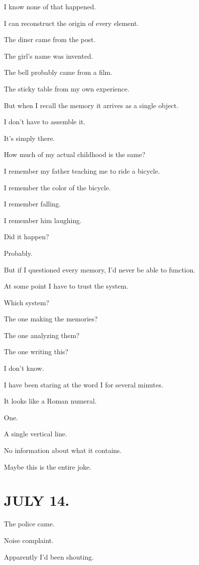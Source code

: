 \documentclass[11pt,oneside]{book}
\begin{document}
I know none of that happened.

I can reconstruct the origin of every element.

The diner came from the post.

The girl's name was invented.

The bell probably came from a film.

The sticky table from my own experience.

But when I recall the memory it arrives as a single object.

I don't have to assemble it.

It's simply there.

How much of my actual childhood is the same?

I remember my father teaching me to ride a bicycle.

I remember the color of the bicycle.

I remember falling.

I remember him laughing.

Did it happen?

Probably.

But if I questioned every memory, I'd never be able to function.

At some point I have to trust the system.

Which system?

The one making the memories?

The one analyzing them?

The one writing this?

I don't know.

I have been staring at the word I for several minutes.

It looks like a Roman numeral.

One.

A single vertical line.

No information about what it contains.

Maybe this is the entire joke.

\section*{JULY 14.}

The police came.

Noise complaint.

Apparently I'd been shouting.
\end{document}

